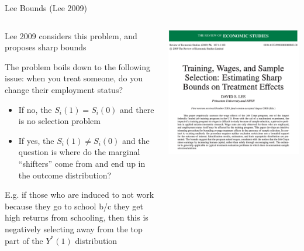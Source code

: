 \documentclass[notes,11pt, aspectratio=169]{beamer}
\newenvironment{wideitemize}{\itemize\addtolength{\itemsep}{10pt}}{\enditemize}
\begin{document}
\begin{frame}{Lee Bounds (Lee 2009)}
      \begin{columns}[onlytextwidth, T] %
        \begin{column}{.5\textwidth}
          \begin{wideitemize}
          \item Lee 2009 considers this problem, and proposes
            sharp bounds
          \item The problem boils down to the following issue: when
            you treat someone, do you change their employment status?
            \begin{itemize}
            \item If no, the $S_{i}(1) = S_{i}(0)$ and there is no
              selection problem
            \item If yes, the $S_{i}(1) \not= S_{i}(0)$ and the
              question is where do the marginal ``shifters'' come from
              and end up in the outcome distribution?
            \end{itemize}
            \vspace{-6pt}
          \item E.g. if those who are induced to not work because they
            go to school b/c they get high returns from schooling,
            then this is negatively selecting away from the top part
            of the $Y^{*}(1)$ distribution
          \end{wideitemize}
      \end{column}%
      \hfill%
      \begin{column}{.5\textwidth}
        \includegraphics[width=\linewidth]{images/lee_1.png}
      \end{column}%
    \end{columns}
\end{frame}
\end{document}
